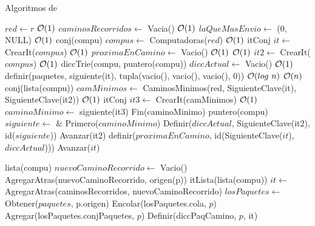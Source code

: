 \begin{Algoritmos}


\begin{algorithm}
  \caption{Algoritmos de }


\begin{algorithmic}[1]
  \State $red \gets r$ \Comment $\mathcal{O}(1)$
  \State $caminosRecorridos \gets$ Vacia() \Comment $\mathcal{O}(1)$ 
  \State $laQueMasEnvio \gets$ (0, NULL) \Comment $\mathcal{O}(1)$
  \State conj(compu) $compus \gets$ Computadoras($red$) \Comment $\mathcal{O}(1)$
   \State itConj $it \gets$ CrearIt($compus$) \Comment $\mathcal{O}(1)$
  \State $proximaEnCamino \gets$ Vacio() \Comment $\mathcal{O}(1)$
   \Comment $\mathcal{O}(1)$
    \State {} $it2 \gets$ CrearIt($compus$) \Comment $\mathcal{O}(1)$
    \State diccTrie(compu, puntero(compu)) $diccActual \gets$ Vacio() \Comment $\mathcal{O}(1)$
	\State definir(paquetes, siguiente(it), tupla(vacio(), vacio(), vacio(), 0)) \Comment $\mathcal{O}(log \ n)$
     \Comment $\mathcal{O}(n)$
      \State conj(lista(compu)) $camMinimos \gets$ CaminosMinimos(red, SiguienteClave(it), SiguienteClave(it2)) \Comment $\mathcal{O}(1)$
      \State itConj $it3 \gets$ CrearIt(camMinimos) \Comment $\mathcal{O}(1)$
      \State $caminoMinimo \gets$ siguiente(it3)
      \State Fin(caminoMinimo)
      \State puntero(compu) $siguiente \gets$ \& Primero($caminoMinimo$)
      \State Definir($diccActual$, SiguienteClave(it2), id($siguiente$))
      \State Avanzar(it2)            
    \EndWhile
    \State definir($proximaEnCamino$, id(SiguienteClave($it$), $diccActual$)))
    \State Avanzar($it$)
  \EndWhile
   
  \EndProcedure
\end{algorithmic}


\begin{algorithmic}[1]
   \State lista(compu) $nuevoCaminoRecorrido \gets$ Vacio()
   \State AgregarAtras(nuevoCaminoRecorrido, origen(p))
   \State itLista(lista(compu)) $it \gets$ AgregarAtras(caminosRecorridos, nuevoCaminoRecorrido)
   \State $losPaquetes \gets $ Obtener($paquetes$, p.origen)
   \State Encolar(losPaquetes.cola, $p$)
   \State Agregar(losPaquetes.conjPaquetes, $p$)
   \State Definir(diccPaqCamino, $p$, it)
   \EndProcedure
\end{algorithmic}


\begin{algorithmic}[1]
  

\end{algorithmic}
\end{algorithm}
\end{Algoritmos}

